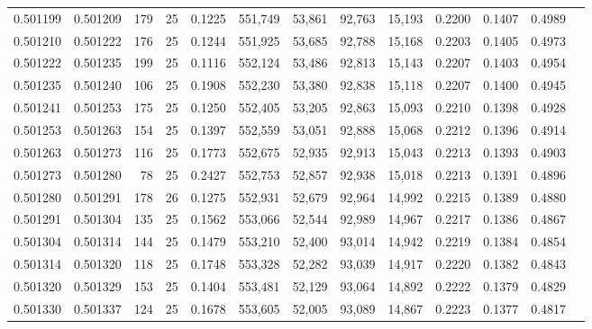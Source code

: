 \begin{tabular}{rrrrrrrrrrrrr}
0.501199 & 0.501209 & 179 &  25 &                                     0.1225 & 551,749 &  53,861 &  92,763 &  15,193 & 0.2200 & 0.1407 & 0.4989 \\
0.501210 & 0.501222 & 176 &  25 &                                     0.1244 & 551,925 &  53,685 &  92,788 &  15,168 & 0.2203 & 0.1405 & 0.4973 \\
0.501222 & 0.501235 & 199 &  25 &                                     0.1116 & 552,124 &  53,486 &  92,813 &  15,143 & 0.2207 & 0.1403 & 0.4954 \\
0.501235 & 0.501240 & 106 &  25 &                                     0.1908 & 552,230 &  53,380 &  92,838 &  15,118 & 0.2207 & 0.1400 & 0.4945 \\
0.501241 & 0.501253 & 175 &  25 &                                     0.1250 & 552,405 &  53,205 &  92,863 &  15,093 & 0.2210 & 0.1398 & 0.4928 \\
0.501253 & 0.501263 & 154 &  25 &                                     0.1397 & 552,559 &  53,051 &  92,888 &  15,068 & 0.2212 & 0.1396 & 0.4914 \\
0.501263 & 0.501273 & 116 &  25 &                                     0.1773 & 552,675 &  52,935 &  92,913 &  15,043 & 0.2213 & 0.1393 & 0.4903 \\
0.501273 & 0.501280 &  78 &  25 &                                     0.2427 & 552,753 &  52,857 &  92,938 &  15,018 & 0.2213 & 0.1391 & 0.4896 \\
0.501280 & 0.501291 & 178 &  26 &                                     0.1275 & 552,931 &  52,679 &  92,964 &  14,992 & 0.2215 & 0.1389 & 0.4880 \\
0.501291 & 0.501304 & 135 &  25 &                                     0.1562 & 553,066 &  52,544 &  92,989 &  14,967 & 0.2217 & 0.1386 & 0.4867 \\
0.501304 & 0.501314 & 144 &  25 &                                     0.1479 & 553,210 &  52,400 &  93,014 &  14,942 & 0.2219 & 0.1384 & 0.4854 \\
0.501314 & 0.501320 & 118 &  25 &                                     0.1748 & 553,328 &  52,282 &  93,039 &  14,917 & 0.2220 & 0.1382 & 0.4843 \\
0.501320 & 0.501329 & 153 &  25 &                                     0.1404 & 553,481 &  52,129 &  93,064 &  14,892 & 0.2222 & 0.1379 & 0.4829 \\
0.501330 & 0.501337 & 124 &  25 &                                     0.1678 & 553,605 &  52,005 &  93,089 &  14,867 & 0.2223 & 0.1377 & 0.4817 \\

\end{tabular}
